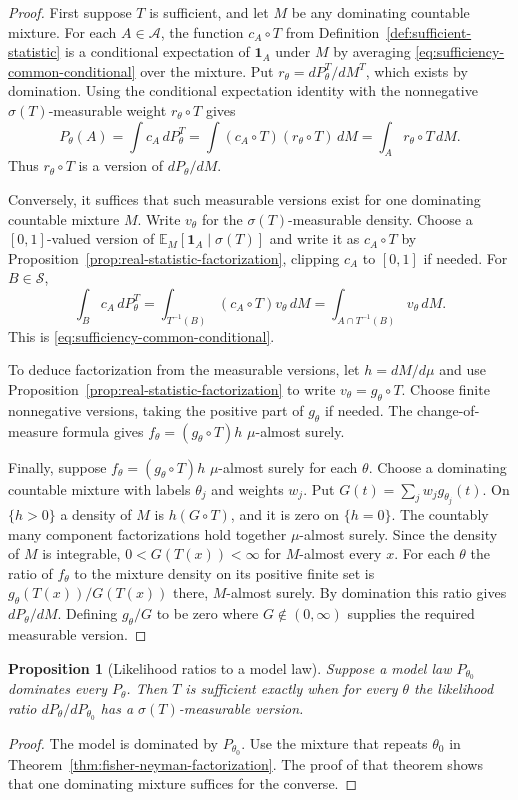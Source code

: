 \documentclass[11pt,oneside]{book}
\newtheorem{proposition}[theorem]{Proposition}
\theoremstyle{definition}
\theoremstyle{remark}
\begin{document}
\begin{proof}
First suppose $T$ is sufficient, and let $M$ be any dominating
countable mixture. For each $A\in\mathcal A$, the function
$c_A\circ T$ from Definition~\ref{def:sufficient-statistic}
is a conditional expectation of $\mathbf 1_A$ under $M$ by averaging
\eqref{eq:sufficiency-common-conditional} over the mixture.
Put $r_\theta=dP_\theta^T/dM^T$, which exists by domination.
Using the conditional expectation identity with the nonnegative
$\sigma(T)$-measurable weight $r_\theta\circ T$ gives
\[
P_\theta(A)=\int c_A\,dP_\theta^T
=\int (c_A\circ T)(r_\theta\circ T)\,dM
=\int_A r_\theta\circ T\,dM .
\]
Thus $r_\theta\circ T$ is a version of $dP_\theta/dM$.

Conversely, it suffices that such measurable versions exist for
one dominating countable mixture $M$. Write $v_\theta$ for the
$\sigma(T)$-measurable density. Choose a $[0,1]$-valued version of
$\mathbb E_M[\mathbf 1_A\mid\sigma(T)]$ and write it as $c_A\circ T$
by Proposition~\ref{prop:real-statistic-factorization}, clipping
$c_A$ to $[0,1]$ if needed. For $B\in\mathcal S$,
\[
\int_B c_A\,dP_\theta^T
=\int_{T^{-1}(B)}(c_A\circ T)v_\theta\,dM
=\int_{A\cap T^{-1}(B)}v_\theta\,dM .
\]
This is \eqref{eq:sufficiency-common-conditional}.

To deduce factorization from the measurable versions, let
$h=dM/d\mu$ and use Proposition~\ref{prop:real-statistic-factorization}
to write $v_\theta=g_\theta\circ T$. Choose finite nonnegative
versions, taking the positive part of $g_\theta$ if needed.
The change-of-measure formula gives $f_\theta=(g_\theta\circ T)h$
$\mu$-almost surely.

Finally, suppose $f_\theta=(g_\theta\circ T)h$ $\mu$-almost surely
for each $\theta$. Choose a dominating countable mixture with
labels $\theta_j$ and weights $w_j$. Put
$G(t)=\sum_jw_jg_{\theta_j}(t)$. On $\{h>0\}$ a density of $M$
is $h(G\circ T)$, and it is zero on $\{h=0\}$.
The countably many component factorizations hold together
$\mu$-almost surely. Since the density of $M$ is integrable,
$0<G(T(x))<\infty$ for $M$-almost every $x$.
For each $\theta$ the ratio of $f_\theta$ to the mixture density
on its positive finite set is $g_\theta(T(x))/G(T(x))$ there,
$M$-almost surely. By domination this ratio gives
$dP_\theta/dM$. Defining $g_\theta/G$ to be zero where
$G\notin(0,\infty)$ supplies the required measurable version.
\end{proof}

\begin{proposition}[Likelihood ratios to a model law]
\label{prop:sufficiency-likelihood-ratios-reference}
Suppose a model law $P_{\theta_0}$ dominates every $P_\theta$.
Then $T$ is sufficient exactly when for every $\theta$ the
likelihood ratio $dP_\theta/dP_{\theta_0}$ has a
$\sigma(T)$-measurable version.
\end{proposition}
\begin{proof}
The model is dominated by $P_{\theta_0}$. Use the mixture that
repeats $\theta_0$ in Theorem~\ref{thm:fisher-neyman-factorization}.
The proof of that theorem shows that one dominating mixture
suffices for the converse.
\end{proof}
\end{document}
